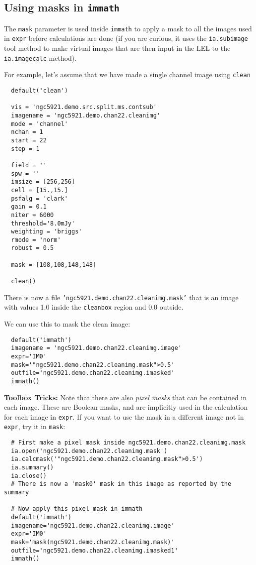 \subsection{Using masks in {\tt immath}}
\label{section:analysis.immath.masks}

The {\tt mask} parameter is used inside {\tt immath} to apply a
mask to all the images used in {\tt expr} before calculations
are done (if you are curious, it uses the {\tt ia.subimage} tool
method to make virtual images that are then input in the LEL to the 
{\tt ia.imagecalc} method).

For example, let's assume that we have made a single channel image
using {\tt clean}
\small
\begin{verbatim}
  default('clean')
  
  vis = 'ngc5921.demo.src.split.ms.contsub'
  imagename = 'ngc5921.demo.chan22.cleanimg'
  mode = 'channel'
  nchan = 1
  start = 22
  step = 1
  
  field = ''
  spw = ''
  imsize = [256,256]
  cell = [15.,15.]
  psfalg = 'clark'
  gain = 0.1
  niter = 6000
  threshold='8.0mJy'
  weighting = 'briggs'
  rmode = 'norm'
  robust = 0.5
  
  mask = [108,108,148,148]
  
  clean()
\end{verbatim}
\normalsize
There is now a file {\tt 'ngc5921.demo.chan22.cleanimg.mask'} that is
an image with values 1.0 inside the {\tt cleanbox} region and 0.0
outside.  

We can use this to mask the clean image:
\small
\begin{verbatim}
  default('immath')
  imagename = 'ngc5921.demo.chan22.cleanimg.image'
  expr='IM0'
  mask='"ngc5921.demo.chan22.cleanimg.mask">0.5'
  outfile='ngc5921.demo.chan22.cleanimg.imasked'
  immath()
\end{verbatim}
\normalsize

{\bf Toolbox Tricks:}
Note that there are also {\it pixel masks} that can be contained in each
image.  These are Boolean masks, and are implicitly used in the
calculation for each image in {\tt expr}.  If you want to use the
mask in a different image not in {\tt expr}, try it in {\tt mask}:
\small
\begin{verbatim}
  # First make a pixel mask inside ngc5921.demo.chan22.cleanimg.mask
  ia.open('ngc5921.demo.chan22.cleanimg.mask')
  ia.calcmask('"ngc5921.demo.chan22.cleanimg.mask">0.5')
  ia.summary()
  ia.close()
  # There is now a 'mask0' mask in this image as reported by the summary

  # Now apply this pixel mask in immath
  default('immath')
  imagename='ngc5921.demo.chan22.cleanimg.image'
  expr='IM0'
  mask='mask(ngc5921.demo.chan22.cleanimg.mask)'
  outfile='ngc5921.demo.chan22.cleanimg.imasked1'
  immath()
\end{verbatim}
\normalsize

